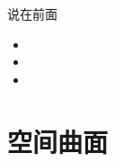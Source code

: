 
\titlepage

\begin{frame}{说在前面}
	\linespread{1.5}
	  \begin{itemize}[<+-|alert@+>]
	    \item {}
	    \item {}
	    \item {}
	  \end{itemize}
\end{frame}


\section{空间曲面}


